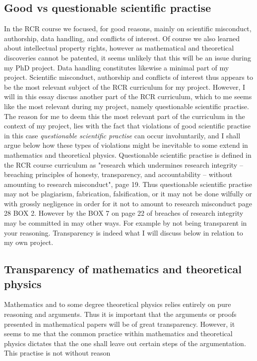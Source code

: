 \documentclass[a4paper, 11pt]{article} %
\begin{document}
\subsection*{Good vs questionable scientific practise}
In the RCR course we focused, for good reasons, mainly on scientific misconduct, authorship, data handling, and conflicts of interest. Of course we also learned about intellectual property rights, however as mathematical and theoretical discoveries cannot be patented, it seems unlikely that this will be an issue during my PhD project. Data handling constitutes likewise a minimal part of my project. Scientific misconduct, authorship and conflicts of interest thus appears to be the most relevant subject of the RCR curriculum for my project. However, I will in this essay discuss another part of the RCR curriculum, which to me seems like the most relevant during my project, namely questionable scientific practise. The reason for me to deem this the most relevant part of the curriculum in the context of my project, lies with the fact that violations of good scientific practise in this case \emph{questionable scientific practise} can occur involuntarily, and I shall argue below how these types of violations might be inevitable to some extend in mathematics and theoretical physics. Questionable scientific practise is defined in the RCR course curriculum as "research which undermines research integrity – breaching principles of honesty, transparency, and
accountability – without amounting to research misconduct", \cite{4d9ee36a3be642848d14f8517fe0f94c} page 19. Thus questionable scientific practise may not be plagiarism, fabrication, falsification, or it may not be done wilfully or with grossly negligence in order for it not to amount to research misconduct \cite{4d9ee36a3be642848d14f8517fe0f94c} page 28 BOX 2. However by the BOX 7 on page 22 of \cite{4d9ee36a3be642848d14f8517fe0f94c} breaches of research integrity may be committed in may other ways. For example by not being transparent in your reasoning. Transparency is indeed what I will discuss below in relation to my own project.
\subsection*{Transparency of mathematics and theoretical physics}
Mathematics and to some degree theoretical physics relies entirely on pure reasoning and arguments. Thus it is important that the arguments or proofs presented in mathematical papers will be of great transparency. However, it seems to me that the common practice within mathematics and theoretical physics dictates that the one shall leave out certain steps of the argumentation. This practise is not without reason 




\end{document}
